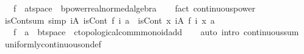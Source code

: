 \begin{isabellebody}
\ \ \ f\ {\isacharcolon}{\kern0pt}{\isacharcolon}{\kern0pt}\ {\isachardoublequoteopen}{\isacharprime}{\kern0pt}a{\isacharcolon}{\kern0pt}{\isacharcolon}{\kern0pt}t{}{\isacharunderscore}{\kern0pt}space\ {\isasymRightarrow}\ {\isacharprime}{\kern0pt}b{\isacharcolon}{\kern0pt}{\isacharcolon}{\kern0pt}{\isacharbraceleft}{\kern0pt}power{\isacharcomma}{\kern0pt}real{\isacharunderscore}{\kern0pt}normed{\isacharunderscore}{\kern0pt}algebra{\isacharbraceright}{\kern0pt}{\isachardoublequoteclose}\isanewline
%
\isadelimproof
\ \ %
\endisadelimproof
%
\isatagproof
{}\isamarkupfalse%
\ {\isacharparenleft}{\kern0pt}fact\ continuous{\isacharunderscore}{\kern0pt}power{\isacharparenright}{\kern0pt}%
\endisatagproof
{\isafoldproof}%
%
\isadelimproof
\isanewline
%
\endisadelimproof
\isanewline
{}\isamarkupfalse%
\ isCont{\isacharunderscore}{\kern0pt}sum\ {\isacharbrackleft}{\kern0pt}simp{\isacharbrackright}{\kern0pt}{\isacharcolon}{\kern0pt}\ {\isachardoublequoteopen}{\isasymforall}i{\isasymin}A{\isachardot}{\kern0pt}\ isCont\ {\isacharparenleft}{\kern0pt}f\ i{\isacharparenright}{\kern0pt}\ a\ {\isasymLongrightarrow}\ isCont\ {\isacharparenleft}{\kern0pt}{\isasymlambda}x{\isachardot}{\kern0pt}\ {\isasymSum}i{\isasymin}A{\isachardot}{\kern0pt}\ f\ i\ x{\isacharparenright}{\kern0pt}\ a{\isachardoublequoteclose}\isanewline
\ \ \ f\ {\isacharcolon}{\kern0pt}{\isacharcolon}{\kern0pt}\ {\isachardoublequoteopen}{\isacharprime}{\kern0pt}a\ {\isasymRightarrow}\ {\isacharprime}{\kern0pt}b{\isacharcolon}{\kern0pt}{\isacharcolon}{\kern0pt}t{}{\isacharunderscore}{\kern0pt}space\ {\isasymRightarrow}\ {\isacharprime}{\kern0pt}c{\isacharcolon}{\kern0pt}{\isacharcolon}{\kern0pt}topological{\isacharunderscore}{\kern0pt}comm{\isacharunderscore}{\kern0pt}monoid{\isacharunderscore}{\kern0pt}add{\isachardoublequoteclose}\isanewline
%
\isadelimproof
\ \ %
\endisadelimproof
%
\isatagproof
{}\isamarkupfalse%
\ {\isacharparenleft}{\kern0pt}auto\ intro{\isacharcolon}{\kern0pt}\ continuous{\isacharunderscore}{\kern0pt}sum{\isacharparenright}{\kern0pt}%
\endisatagproof
{\isafoldproof}%
%
\isadelimproof
%
\endisadelimproof
%
\isadelimdocument
%
\endisadelimdocument
%
\isatagdocument
%
\isamarkuptrue%
%
\endisatagdocument
{\isafolddocument}%
%
\isadelimdocument
%
\endisadelimdocument
{}\isamarkupfalse%
\ uniformly{\isacharunderscore}{\kern0pt}continuous{\isacharunderscore}{\kern0pt}on{\isacharunderscore}{\kern0pt}def{\isacharcolon}{\kern0pt}\isanewline

\end{isabellebody}
